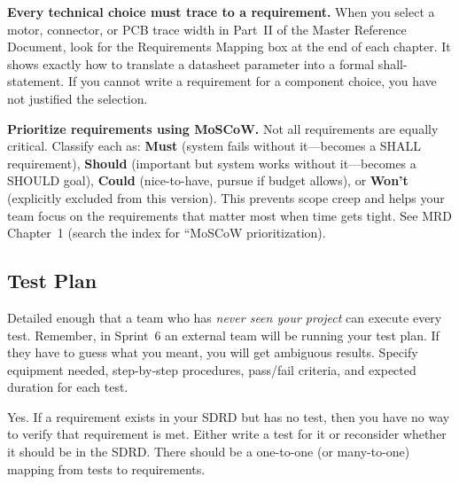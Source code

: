 \documentclass[11pt,letterpaper]{article}
\begin{document}
\begin{protip}
\textbf{Every technical choice must trace to a requirement.} When you select a motor, connector, or PCB trace width in Part~II of the Master Reference Document, look for the Requirements Mapping box at the end of each chapter. It shows exactly how to translate a datasheet parameter into a formal shall-statement. If you cannot write a requirement for a component choice, you have not justified the selection.
\end{protip}

\begin{protip}
\textbf{Prioritize requirements using MoSCoW.} Not all requirements are equally critical. Classify each as: \textbf{Must} (system fails without it---becomes a SHALL requirement), \textbf{Should} (important but system works without it---becomes a SHOULD goal), \textbf{Could} (nice-to-have, pursue if budget allows), or \textbf{Won't} (explicitly excluded from this version). This prevents scope creep and helps your team focus on the requirements that matter most when time gets tight. See MRD Chapter~1 (search the index for ``MoSCoW prioritization).
\end{protip}

\subsection{Test Plan}

\begin{faqbox}
Detailed enough that a team who has \textit{never seen your project} can execute every test. Remember, in Sprint~6 an external team will be running your test plan. If they have to guess what you meant, you will get ambiguous results. Specify equipment needed, step-by-step procedures, pass/fail criteria, and expected duration for each test.
\end{faqbox}

\begin{faqbox}
Yes. If a requirement exists in your SDRD but has no test, then you have no way to verify that requirement is met. Either write a test for it or reconsider whether it should be in the SDRD. There should be a one-to-one (or many-to-one) mapping from tests to requirements.
\end{faqbox}
\end{document}
